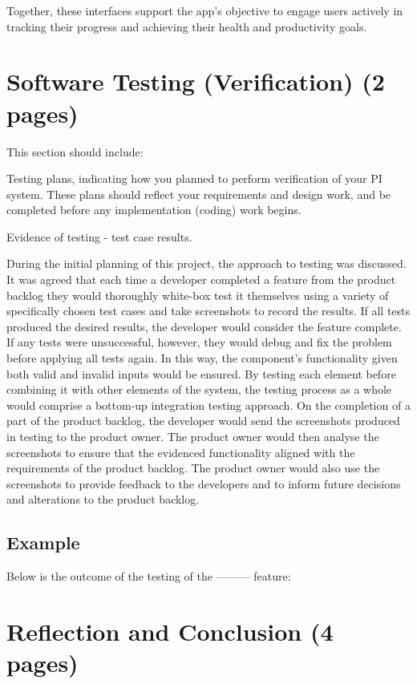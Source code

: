\documentclass[12pt]{article}
\begin{document}
Together, these interfaces support the app’s objective to engage users actively in tracking
their progress and achieving their health and productivity goals.\par


\section{Software Testing (Verification) (2 pages)}

This section should include:

Testing plans, indicating how you planned to perform verification of your PI
system. These plans should reflect your requirements and design work, and be
completed before any implementation (coding) work begins.

Evidence of testing - test case results.

During the initial planning of this project, the approach to testing was
discussed. It was agreed that each time a developer completed a feature from
the product backlog they would thoroughly white-box test it themselves using a
variety of specifically chosen test cases and take screenshots to record the
results. If all tests produced the desired results, the developer would
consider the feature complete. If any tests were unsuccessful, however, they
would debug and fix the problem before applying all tests again. In this way,
the component's functionality given both valid and invalid inputs would be
ensured. By testing each element before combining it with other elements of the
system, the testing process as a whole would comprise a bottom-up integration
testing approach. On the completion of a part of the product backlog, the
developer would send the screenshots produced in testing to the product owner.
The product owner would then analyse the screenshots to ensure that the
evidenced functionality aligned with the requirements of the product backlog.
The product owner would also use the screenshots to provide feedback to the
developers and to inform future decisions and alterations to the product
backlog.\par

\subsection{Example}
Below is the outcome of the testing of the --------- feature:


\section{Reflection and Conclusion (4 pages)}
\end{document}
